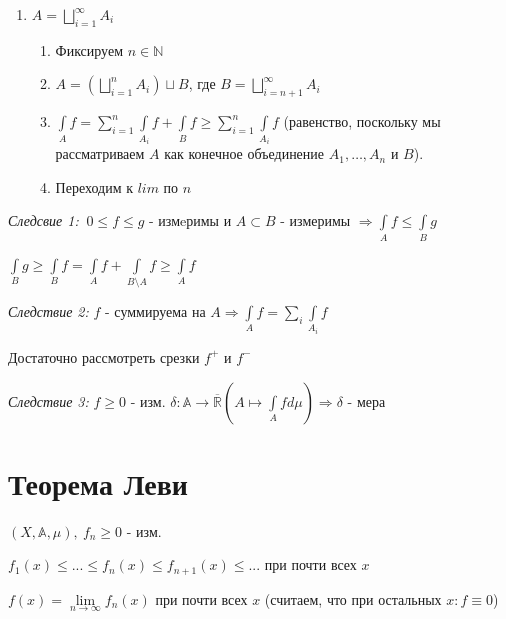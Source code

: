 \documentclass[paper=a4, fontsize=17pt]{article}
\begin{document}
\begin{enumerate}
\begin{enumerate}
	\item $A = \bigsqcup\limits_{i = 1}^{\infty}A_{i}$
		\begin{enumerate}
			\item Фиксируем $n \in \mathbb{N}$

			\item $A = (\bigsqcup\limits_{i=1}^{n}A_{i}) \sqcup B$, где $B = \bigsqcup\limits_{i=n+1}^{\infty}A_{i}$

			\item $\int\limits_{A}f = \sum\limits_{i=1}^{n} \int\limits_{A_i}f + \int\limits_{B}f \geqslant \sum\limits_{i=1}^{n} \int\limits_{A_i}f$ (равенство, поскольку мы рассматриваем $A$ как конечное объединение $A_1,\dots,A_n$ и $B$).

			\item Переходим к $lim$ по $n$
		\end{enumerate}

	\end{enumerate}

\end{enumerate}

\emph{Следсвие 1:}
$\ 0 \leqslant f \leqslant g$ - измeримы и  $A \subset B$ - измеримы $\Rightarrow \int\limits_{A}f \leqslant \int\limits_{B}g$

$\int\limits_{B}g \geqslant \int\limits_{B}f = \int\limits_{A}f + \int\limits_{B \setminus A}f \geqslant \int\limits_{A}f$

\bigskip

\emph{Следствие 2:}
$f$ - суммируема на $A \Rightarrow \int\limits_{A}f = \sum\limits_{i} \int\limits_{A_{i}}f$

Достаточно рассмотреть срезки $f^+$ и $f^-$

\bigskip

\emph{Следствие 3:}
$f \geqslant 0$ - изм. $\delta: \mathbb{A} \rightarrow \mathbb{\overline{R}}(A\longmapsto \int\limits_{A}fd\mu) \Rightarrow \delta$ - мера

\section{Теорема Леви}
$(X,\mathds{A},\mu),\ f_n \geqslant 0$ - изм.

$f_1(x) \leqslant ...\leqslant f_n(x) \leqslant f_{n+1}(x) \leqslant ...$ при почти всех $x$

$f(x) = \lim\limits_{n \rightarrow \infty}f_n(x)$ при почти всех $x$ (считаем, что при остальных $x: f \equiv 0$)
\\
\end{document}

